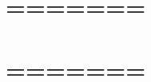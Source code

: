 \documentclass[5pt,a4paper]{scrartcl}
\begin{document}
	\section*{=======}
	
	\cite{bacco-lagrangian-bias}
	
		\section*{=======}
	
	\cite{2011EPJP..126...55D}
	
\end{document}
